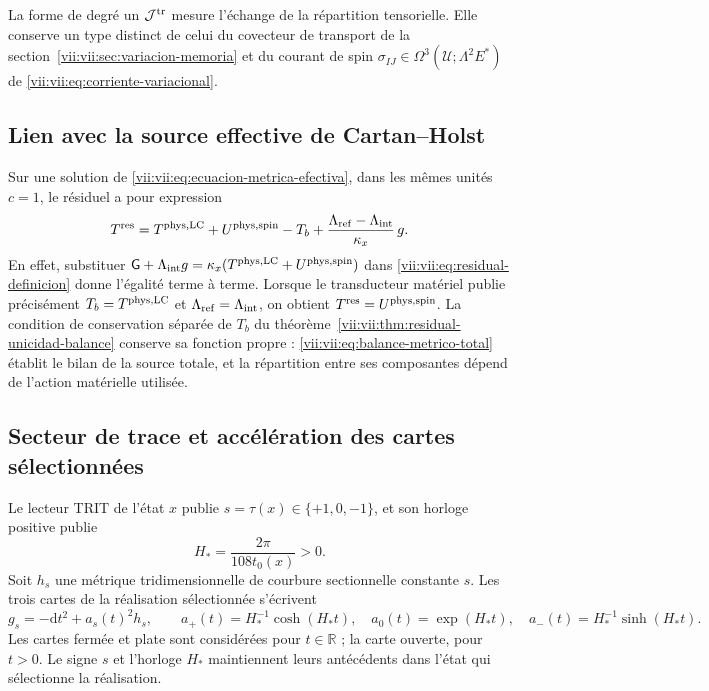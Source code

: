 La forme de degré un \(\mathcal J^{\rm tr}\) mesure l'échange de la répartition tensorielle. Elle conserve un type distinct de celui du covecteur de transport de la section~\ref{vii:vii:sec:variacion-memoria} et du courant de spin \(\sigma_{IJ}\in\Omega^3(\mathcal U;\Lambda^2E^*)\) de \eqref{vii:vii:eq:corriente-variacional}.

\subsection{Lien avec la source effective de Cartan--Holst}
\label{vii:vii:subsec:residual-fuente-cartan}

Sur une solution de \eqref{vii:vii:eq:ecuacion-metrica-efectiva}, dans les
mêmes unités \(c=1\), le résiduel a pour expression
\begin{equation}
 T^{\rm res}
 =T^{\rm phys,LC}+U^{\rm phys,spin}-T_b
   +\frac{\Lambda_{\rm ref}-\Lambda_{\rm int}}{\kappa_x}\,g.
 \label{vii:vii:eq:residual-composicion-cartan}
\end{equation}
En effet, substituer
\(\mathsf G+\Lambda_{\rm int}g
  =\kappa_x(T^{\rm phys,LC}+U^{\rm phys,spin})\)
dans \eqref{vii:vii:eq:residual-definicion} donne l'égalité terme à terme.
Lorsque le transducteur matériel publie précisément
\(T_b=T^{\rm phys,LC}\) et \(\Lambda_{\rm ref}=\Lambda_{\rm int}\),
on obtient \(T^{\rm res}=U^{\rm phys,spin}\).
La condition de conservation séparée de \(T_b\) du
théorème~\ref{vii:vii:thm:residual-unicidad-balance} conserve sa fonction
propre : \eqref{vii:vii:eq:balance-metrico-total} établit le bilan de la
source totale, et la répartition entre ses composantes dépend de l'action
matérielle utilisée.

\subsection{Secteur de trace et accélération des cartes sélectionnées}
\label{vii:vii:subsec:residual-aceleracion-ds}

Le lecteur TRIT de l'état \(x\) publie \(s=\tau(x)\in\{+1,0,-1\}\), et son horloge positive publie
\begin{equation}
 H_*=\frac{2\pi}{108t_0(x)}>0.
 \label{vii:vii:eq:reloj-carta-ds}
\end{equation}
Soit \(h_s\) une métrique tridimensionnelle de courbure sectionnelle constante
\(s\). Les trois cartes de la réalisation sélectionnée s'écrivent
\begin{equation}
 g_s=-\mathrm dt^2+a_s(t)^2h_s,\qquad
 a_+(t)=H_*^{-1}\cosh(H_*t),\quad
 a_0(t)=\exp(H_*t),\quad
 a_-(t)=H_*^{-1}\sinh(H_*t).
 \label{vii:vii:eq:cartas-ds-residual}
\end{equation}
Les cartes fermée et plate sont considérées pour \(t\in\mathbb R\) ; la carte ouverte, pour \(t>0\). Le signe \(s\) et l'horloge \(H_*\) maintiennent leurs antécédents dans l'état qui sélectionne la réalisation.

